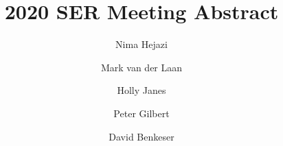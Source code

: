 \documentclass[]{elsarticle} %
\begin{document}
\begin{frontmatter}

  \title{2020 SER Meeting Abstract}
    \author[biostat-berkeley]{Nima Hejazi}
  
    \author[epibiostat-berkeley]{Mark van der Laan}
  
    \author[fredhutch]{Holly Janes}
  
    \author[fredhutch]{Peter Gilbert}
  
    \author[emory]{David Benkeser}
  
      \address[biostat-berkeley]{Graduate Group in Biostatistics, University of California, Berkeley}
    \address[epibiostat-berkeley]{Division of Epidemiology and Biostatistics, University of California,
Berkeley}
    \address[fredhutch]{Vaccine and Infectious Disease Division, Fred Hutchinson Cancer Research
Center}
    \address[emory]{Department of Biostatistics and Bioinformatics, Emory University}
  
  \begin{abstract}
  
  \end{abstract}
  
 \end{frontmatter}
\end{document}
